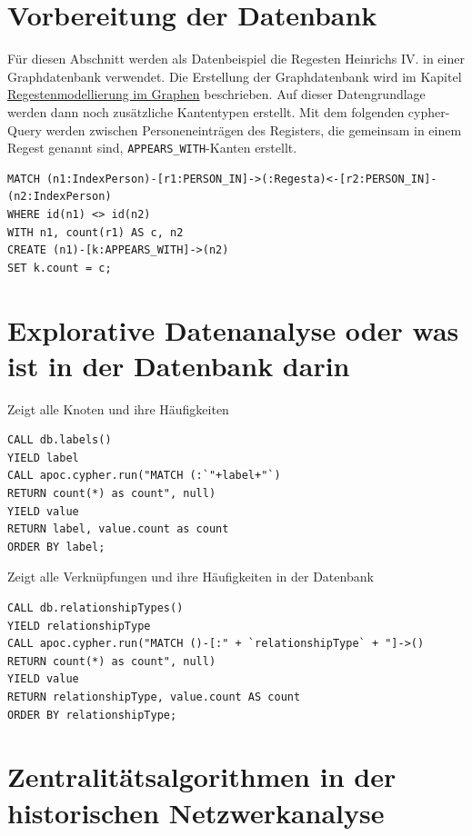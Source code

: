 \documentclass[ngerman,]{scrreprt}
\begin{document}
\section{Vorbereitung der Datenbank}\label{vorbereitung-der-datenbank}

Für diesen Abschnitt werden als Datenbeispiel die Regesten Heinrichs IV. in einer Graphdatenbank verwendet. Die Erstellung der Graphdatenbank wird im Kapitel \href{20_Regestenmodellierung-im-Graphen.md}{Regestenmodellierung im Graphen} beschrieben. Auf dieser Datengrundlage werden dann noch zusätzliche Kantentypen erstellt. Mit dem folgenden cypher-Query werden zwischen Personeneinträgen des Registers, die gemeinsam in einem Regest genannt sind, \texttt{APPEARS\_WITH}-Kanten erstellt.

\begin{verbatim}
MATCH (n1:IndexPerson)-[r1:PERSON_IN]->(:Regesta)<-[r2:PERSON_IN]-(n2:IndexPerson)
WHERE id(n1) <> id(n2)
WITH n1, count(r1) AS c, n2
CREATE (n1)-[k:APPEARS_WITH]->(n2)
SET k.count = c;
\end{verbatim}

\section{Explorative Datenanalyse oder was ist in der Datenbank darin}\label{explorative-datenanalyse-oder-was-ist-in-der-datenbank-darin}

Zeigt alle Knoten und ihre Häufigkeiten

\begin{verbatim}
CALL db.labels()
YIELD label
CALL apoc.cypher.run("MATCH (:`"+label+"`)
RETURN count(*) as count", null)
YIELD value
RETURN label, value.count as count
ORDER BY label;
\end{verbatim}

Zeigt alle Verknüpfungen und ihre Häufigkeiten in der Datenbank

\begin{verbatim}
CALL db.relationshipTypes()
YIELD relationshipType
CALL apoc.cypher.run("MATCH ()-[:" + `relationshipType` + "]->()
RETURN count(*) as count", null)
YIELD value
RETURN relationshipType, value.count AS count
ORDER BY relationshipType;
\end{verbatim}

\section{Zentralitätsalgorithmen in der historischen Netzwerkanalyse}\label{zentralituxe4tsalgorithmen-in-der-historischen-netzwerkanalyse}
\end{document}

